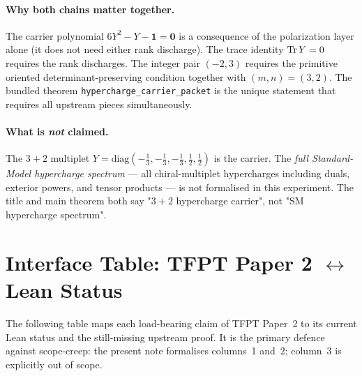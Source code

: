 \documentclass[11pt,a4paper]{article}
\begin{document}
\paragraph{Why both chains matter together.}
The carrier polynomial $6 Y^2 - Y - \mathbf 1 = \mathbf 0$ is a
consequence of the polarization layer alone (it does not need
either rank discharge). The trace identity $\operatorname{Tr} Y = 0$ requires
the rank discharges. The integer pair $(-2, 3)$ requires the
primitive oriented determinant-preserving condition together
with $(m, n) = (3, 2)$. The bundled theorem
\texttt{hypercharge\_carrier\_packet} is the unique statement
that requires all upstream pieces simultaneously.

\paragraph{What is \emph{not} claimed.} The $3+2$ multiplet
$Y = \mathrm{diag}(-\tfrac13, -\tfrac13, -\tfrac13, \tfrac12, \tfrac12)$
is the carrier. The \emph{full Standard-Model hypercharge
spectrum} --- all chiral-multiplet hypercharges including duals,
exterior powers, and tensor products --- is not formalised in
this experiment. The title and main theorem both say "$3+2$
hypercharge carrier", not "SM hypercharge spectrum".

\section{Interface Table: TFPT Paper 2 \texorpdfstring{$\leftrightarrow$}{<->} Lean Status}
\label{sec:interface-table}

The following table maps each load-bearing claim of TFPT
Paper~2 to its current Lean status and the still-missing
upstream proof. It is the primary defence against scope-creep:
the present note formalises columns~1 and~2; column~3 is
explicitly out of scope.
\end{document}

